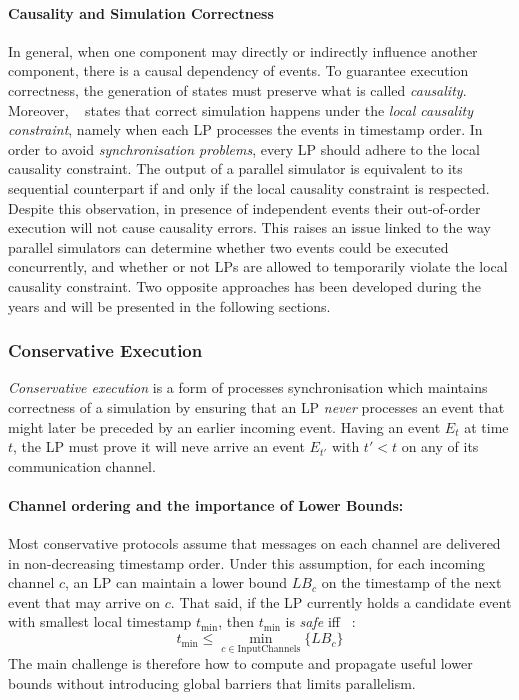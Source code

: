 \paragraph{Causality and Simulation Correctness}
In general, when one component may directly or indirectly influence another
component, there is a causal dependency of events. To guarantee execution
correctness, the generation of
states must preserve what is called \emph{causality}. Moreover,
~\cite{Fujimoto1990PDES} states that correct simulation happens under the
\emph{local causality constraint}, namely when each \ac{LP} processes the
events in timestamp order.
In order to avoid \emph{synchronisation problems}, every \ac{LP} should adhere
to the local causality constraint.
The output of a parallel simulator is equivalent to its sequential counterpart
if and only if the local causality constraint is respected. Despite this
observation, in presence of independent events their out-of-order execution
will not cause causality errors. This raises an issue linked to the way
parallel simulators can determine whether two events could be executed
concurrently, and whether or not \ac{LP}s are allowed to temporarily violate
the local causality constraint. Two opposite approaches has been developed
during the years and will be presented in the following sections.

\subsubsection{Conservative Execution}\label{sssec:conservative_pdes}

\emph{Conservative execution} is a form of processes synchronisation which
maintains correctness of a simulation by ensuring that an \ac{LP} \emph{never}
processes an event that might later be preceded by an earlier incoming event.
Having an event $E_t$ at time $t$, the \ac{LP} must prove it will neve arrive
an event $E_{t'}$ with $t' < t$ on any of its communication channel.

\paragraph{Channel ordering and the importance of Lower Bounds:} Most
conservative protocols assume that messages on each channel are delivered in
non-decreasing timestamp order. Under this assumption, for each incoming channel
$c$, an \ac{LP} can maintain a lower bound $LB_c$ on the timestamp of the
next event that may arrive on $c$.
That said, if the \ac{LP} currently holds a candidate event with smallest
local timestamp $t_{\text{min}}$, then $t_{\text{min}}$ is \emph{safe} iff ~\cite{fujimoto1999Pads}:
\begin{equation}
	t_{\text{min}} \leq \min_{c \in \text{InputChannels}} \{LB_c\}
\end{equation}
The main challenge is therefore how to compute and propagate useful lower
bounds without introducing global barriers that limits parallelism.

